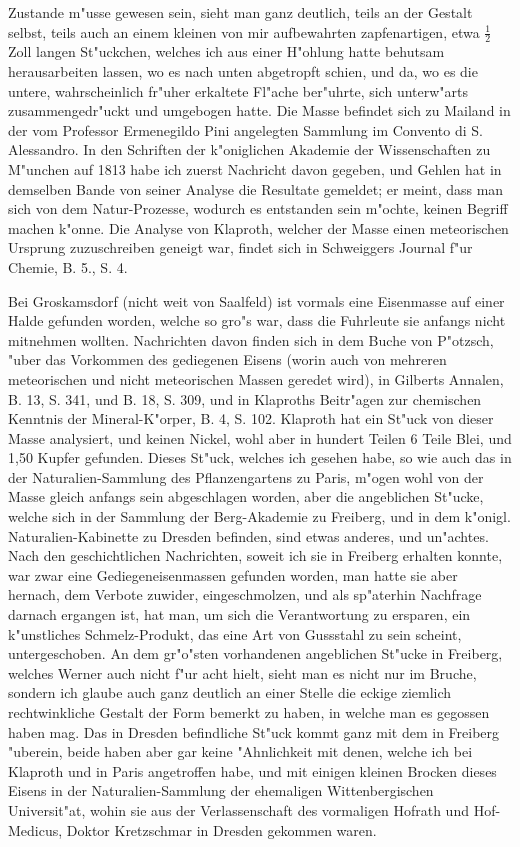 \documentclass[a4paper, 11pt, oneside, polutonikogreek, german]{article}
\begin{document}
Zustande m"usse gewesen sein, sieht man ganz deutlich, teils an der Gestalt selbst, teils auch an einem kleinen von mir aufbewahrten zapfenartigen, etwa $\mathfrak{\frac{1}{2}}$ Zoll langen St"uckchen, welches ich aus einer H"ohlung hatte behutsam herausarbeiten lassen, wo es nach unten abgetropft schien, und da, wo es die untere, wahrscheinlich fr"uher erkaltete Fl"ache ber"uhrte, sich unterw"arts zusammengedr"uckt und umgebogen hatte. Die Masse befindet sich zu Mailand in der vom Professor Ermenegildo Pini angelegten Sammlung im Convento di S. Alessandro. In den Schriften der k"oniglichen Akademie der Wissenschaften zu M"unchen auf 1813 habe ich zuerst Nachricht davon gegeben, und Gehlen hat in demselben Bande von seiner Analyse die Resultate gemeldet; er meint, dass man sich von dem Natur-Prozesse, wodurch es entstanden sein m"ochte, keinen Begriff machen k"onne. Die Analyse von Klaproth, welcher der Masse einen meteorischen Ursprung zuzuschreiben geneigt war, findet sich in Schweiggers Journal f"ur Chemie, B. 5., S. 4.

Bei Groskamsdorf (nicht weit von Saalfeld) ist vormals eine Eisenmasse auf einer Halde gefunden worden, welche so gro"s war, dass die Fuhrleute sie anfangs nicht mitnehmen wollten. Nachrichten davon finden sich in dem Buche von P"otzsch, "uber das Vorkommen des gediegenen Eisens (worin auch von mehreren meteorischen und nicht meteorischen Massen geredet wird), in Gilberts Annalen, B. 13, S. 341, und B. 18, S. 309, und in Klaproths Beitr"agen zur chemischen Kenntnis der Mineral-K"orper, B. 4, S. 102. Klaproth hat ein St"uck von dieser Masse analysiert, und keinen Nickel, wohl aber in hundert Teilen 6 Teile Blei, und 1,50 Kupfer gefunden. Dieses St"uck, welches ich gesehen habe, so wie auch das in der Naturalien-Sammlung des Pflanzengartens zu Paris, m"ogen wohl von der Masse gleich anfangs sein abgeschlagen worden, aber die angeblichen St"ucke, welche sich in der Sammlung der Berg-Akademie zu Freiberg, und in dem k"onigl. Naturalien-Kabinette zu Dresden befinden, sind etwas anderes, und un"achtes. Nach den geschichtlichen Nachrichten, soweit ich sie in Freiberg erhalten konnte, war zwar eine Gediegeneisenmassen gefunden worden, man hatte sie aber hernach, dem Verbote zuwider, eingeschmolzen, und als sp"aterhin Nachfrage darnach ergangen ist, hat man, um sich die Verantwortung zu ersparen, ein k"unstliches Schmelz-Produkt, das eine Art von Gussstahl zu sein scheint, untergeschoben. An dem gr"o"sten vorhandenen angeblichen St"ucke in Freiberg, welches Werner auch nicht f"ur acht hielt, sieht man es nicht nur im Bruche, sondern ich glaube auch ganz deutlich an einer Stelle die eckige ziemlich rechtwinkliche Gestalt der Form bemerkt zu haben, in welche man es gegossen haben mag. Das in Dresden befindliche St"uck kommt ganz mit dem in Freiberg "uberein, beide haben aber gar keine "Ahnlichkeit mit denen, welche ich bei Klaproth und in Paris angetroffen habe, und mit einigen kleinen Brocken dieses Eisens in der Naturalien-Sammlung der ehemaligen Wittenbergischen Universit"at, wohin sie aus der Verlassenschaft des vormaligen Hofrath und Hof-Medicus, Doktor Kretzschmar in Dresden gekommen waren.
\end{document}
